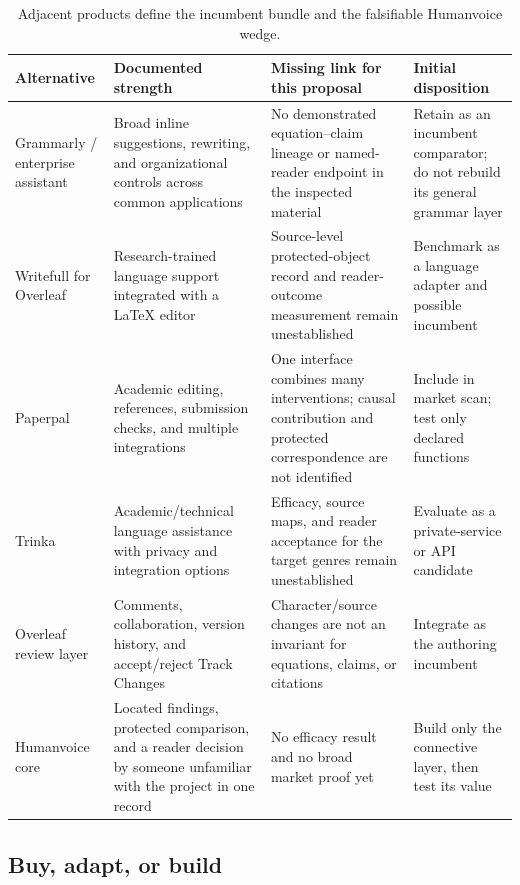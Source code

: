 \begin{table}[H]
\centering
\small
\begin{tabularx}{\textwidth}{@{}>{\raggedright\arraybackslash}p{}
                              >{\raggedright\arraybackslash}p{}L
                              >{\raggedright\arraybackslash}p{0.23\textwidth}@{}}
\toprule
Alternative & Documented strength & Missing link for this proposal & Initial
disposition \\
\midrule
Grammarly / enterprise assistant & Broad inline suggestions, rewriting, and
organizational controls across common applications & No demonstrated
equation--claim lineage or named-reader endpoint in the inspected material &
Retain as an incumbent comparator; do not rebuild its general grammar layer \\
Writefull for Overleaf & Research-trained language support integrated with a
LaTeX editor & Source-level protected-object record and reader-outcome
measurement remain unestablished & Benchmark as a language adapter and
possible incumbent \\
Paperpal & Academic editing, references, submission checks, and multiple
integrations & One interface combines many interventions; causal contribution
and protected correspondence are not identified & Include in market scan;
test only declared functions \\
Trinka & Academic/technical language assistance with privacy and integration
options & Efficacy, source maps, and reader acceptance for the target genres
remain unestablished & Evaluate as a private-service or API candidate \\
Overleaf review layer & Comments, collaboration, version history, and
accept/reject Track Changes & Character/source changes are not an invariant
for equations, claims, or citations & Integrate as the authoring incumbent \\
Humanvoice core & Located findings, protected comparison, and a reader decision
by someone unfamiliar with the project in one record & No efficacy result and no broad market proof
yet & Build only the connective layer, then test its value \\
\bottomrule
\end{tabularx}
\caption{Adjacent products define the incumbent bundle and the falsifiable
Humanvoice wedge.}
\label{tab:software-adjacent}
\end{table}

\subsection{Buy, adapt, or build}

